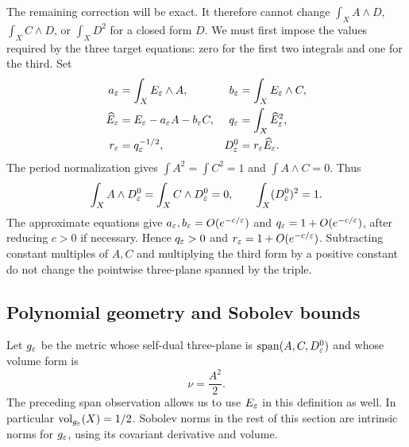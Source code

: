 The remaining correction will be exact.  It therefore cannot change
$\int_X A\wedge D$, $\int_X C\wedge D$, or $\int_X D^2$ for a closed
form $D$.  We must first impose the values required by the three target
equations: zero for the first two integrals and one for the third.  Set
\begin{equation}
\begin{aligned}
  a_\varepsilon&=\int_X E_\varepsilon\wedge A,&
  b_\varepsilon&=\int_X E_\varepsilon\wedge C,\\
  \widehat E_\varepsilon&=E_\varepsilon-a_\varepsilon A-b_\varepsilon C,&
  q_\varepsilon&=\int_X\widehat E_\varepsilon^2,\\
  r_\varepsilon&=q_\varepsilon^{-1/2},&
  D^0_\varepsilon&=r_\varepsilon\widehat E_\varepsilon .
\end{aligned}
\label{eq:auxiliary-normalization}
\end{equation}
The period normalization gives
$\int A^2=\int C^2=1$ and $\int A\wedge C=0$.  Thus
\begin{equation}
  \int_X A\wedge D^0_\varepsilon
  =\int_X C\wedge D^0_\varepsilon=0,\qquad
  \int_X(D^0_\varepsilon)^2=1.
  \label{eq:auxiliary-exact-moments}
\end{equation}
The approximate equations give
$a_\varepsilon,b_\varepsilon=O(e^{-c/\varepsilon})$ and
$q_\varepsilon=1+O(e^{-c/\varepsilon})$, after reducing $c>0$ if necessary.
Hence $q_\varepsilon>0$ and $r_\varepsilon=1+O(e^{-c/\varepsilon})$.
Subtracting constant multiples of $A,C$ and multiplying the third form
by a positive constant do not change the pointwise three-plane spanned
by the triple.

\subsection{Polynomial geometry and Sobolev bounds}

Let $g_\varepsilon$ be the metric whose self-dual three-plane is
$\operatorname{span}(A,C,D^0_\varepsilon)$ and whose volume form is
\begin{equation}
  \nu=\frac{A^2}{2}.
  \label{eq:auxiliary-fixed-volume}
\end{equation}
The preceding span observation allows us to use $E_\varepsilon$ in this
definition as well.  In particular $\operatorname{vol}_{g_\varepsilon}(X)=1/2$.
Sobolev norms in the rest of this section are intrinsic norms for
$g_\varepsilon$, using its covariant derivative and volume.

